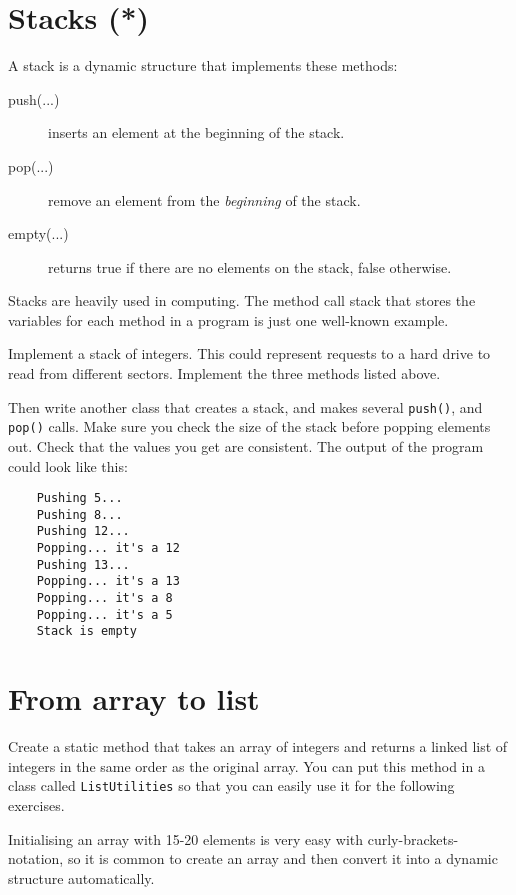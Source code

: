 \documentclass{article}
\begin{document}
\section{Stacks (*)}
\label{sec:stack}

A stack is a dynamic structure that implements these methods: 

\begin{description}
\item[push(...)] inserts an element at the beginning of the stack.
\item[pop(...) ] remove an element from the \emph{beginning} of the stack.
\item[empty(...) ] returns true if there are no elements on the stack,
  false otherwise.
\end{description}

Stacks are heavily used in computing. The method call stack that
stores the variables for each method in a program is just one
well-known example. 

Implement a stack of integers. This could represent requests
to a hard drive to read from different sectors. Implement the three
methods listed above. 

Then write another class that creates a stack, and makes several
\verb+push()+, and \verb+pop()+ calls. Make sure you check the size of
the stack before popping elements out. Check
that the values you get are consistent. The output of the program
could look like this: 

\begin{verbatim}
    Pushing 5...
    Pushing 8...
    Pushing 12...
    Popping... it's a 12
    Pushing 13...
    Popping... it's a 13
    Popping... it's a 8
    Popping... it's a 5
    Stack is empty
\end{verbatim}

\section{From array to list}
\label{sec:from-array-string}

Create a static method that takes an array of integers and returns a
linked list of integers in the same order as the original array. You
can put this method in a class called \verb+ListUtilities+ so that you
can easily use it for the following exercises. 

Initialising an array with 15-20 elements is very easy with
curly-brackets-notation, so it is 
common to create an array and then convert it into a dynamic structure
automatically. 
\end{document}
